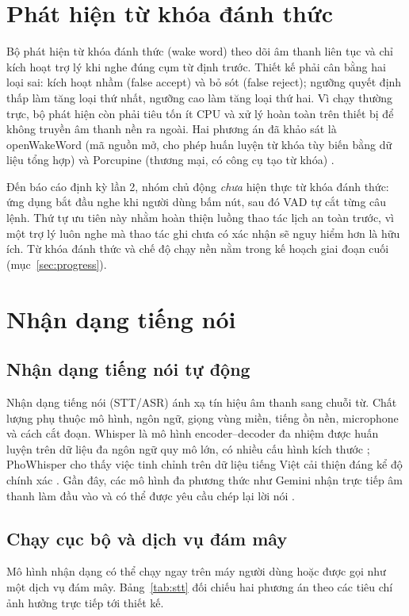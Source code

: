 \section{Phát hiện từ khóa đánh thức}
Bộ phát hiện từ khóa đánh thức (wake word) theo dõi âm thanh liên tục và chỉ kích hoạt trợ lý khi nghe đúng cụm từ định trước. Thiết kế phải cân bằng hai loại sai: kích hoạt nhầm (false accept) và bỏ sót (false reject); ngưỡng quyết định thấp làm tăng loại thứ nhất, ngưỡng cao làm tăng loại thứ hai. Vì chạy thường trực, bộ phát hiện còn phải tiêu tốn ít CPU và xử lý hoàn toàn trên thiết bị để không truyền âm thanh nền ra ngoài. Hai phương án đã khảo sát là openWakeWord (mã nguồn mở, cho phép huấn luyện từ khóa tùy biến bằng dữ liệu tổng hợp) và Porcupine (thương mại, có công cụ tạo từ khóa) \cite{openwakeword,porcupine}.

Đến báo cáo định kỳ lần 2, nhóm chủ động \textit{chưa} hiện thực từ khóa đánh thức: ứng dụng bắt đầu nghe khi người dùng bấm nút, sau đó VAD tự cắt từng câu lệnh. Thứ tự ưu tiên này nhằm hoàn thiện luồng thao tác lịch an toàn trước, vì một trợ lý luôn nghe mà thao tác ghi chưa có xác nhận sẽ nguy hiểm hơn là hữu ích. Từ khóa đánh thức và chế độ chạy nền nằm trong kế hoạch giai đoạn cuối (mục~\ref{sec:progress}).

\section{Nhận dạng tiếng nói}
\subsection{Nhận dạng tiếng nói tự động}
Nhận dạng tiếng nói (STT/ASR) ánh xạ tín hiệu âm thanh sang chuỗi từ. Chất lượng phụ thuộc mô hình, ngôn ngữ, giọng vùng miền, tiếng ồn nền, microphone và cách cắt đoạn. Whisper là mô hình encoder–decoder đa nhiệm được huấn luyện trên dữ liệu đa ngôn ngữ quy mô lớn, có nhiều cấu hình kích thước \cite{radford2022whisper}; PhoWhisper cho thấy việc tinh chỉnh trên dữ liệu tiếng Việt cải thiện đáng kể độ chính xác \cite{phowhisper}. Gần đây, các mô hình đa phương thức như Gemini nhận trực tiếp âm thanh làm đầu vào và có thể được yêu cầu chép lại lời nói \cite{geminiaudio}.

\subsection{Chạy cục bộ và dịch vụ đám mây}
Mô hình nhận dạng có thể chạy ngay trên máy người dùng hoặc được gọi như một dịch vụ đám mây. Bảng~\ref{tab:stt} đối chiếu hai phương án theo các tiêu chí ảnh hưởng trực tiếp tới thiết kế.


